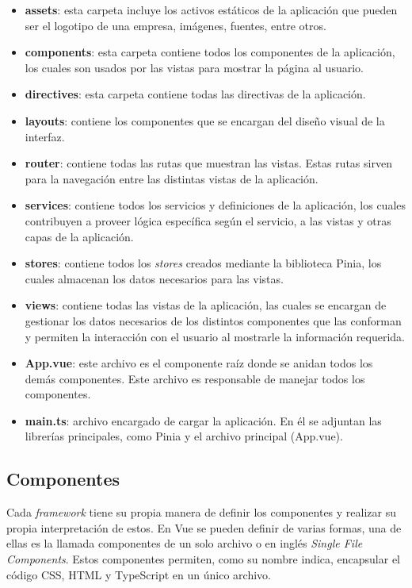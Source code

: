 \begin{itemize}
\item \textbf{assets}: esta carpeta incluye los activos estáticos de la aplicación que pueden ser el logotipo de una empresa, imágenes, fuentes, entre otros.
\item \textbf{components}: esta carpeta contiene todos los componentes de la aplicación, los cuales son usados por las vistas para mostrar la página al usuario.
\item \textbf{directives}: esta carpeta contiene todas las directivas de la aplicación.
\item \textbf{layouts}: contiene los componentes que se encargan del diseño visual de la interfaz.
\item \textbf{router}: contiene todas las rutas que muestran las vistas. Estas rutas sirven para la navegación entre las distintas vistas de la aplicación.
\item \textbf{services}: contiene todos los servicios y definiciones de la aplicación, los cuales contribuyen a proveer lógica específica según el servicio, a las vistas y otras capas de la aplicación.
\item \textbf{stores}: contiene todos los \textit{stores} creados mediante la biblioteca Pinia, los cuales almacenan los datos necesarios para las vistas.
\item \textbf{views}: contiene todas las vistas de la aplicación, las cuales se encargan de gestionar los datos necesarios de los distintos componentes que las conforman y permiten la interacción con el usuario al mostrarle la información requerida.
\item \textbf{App.vue}: este archivo es el componente raíz donde se anidan todos los demás componentes. Este archivo es responsable de manejar todos los componentes.
\item \textbf{main.ts}: archivo encargado de cargar la aplicación. En él se adjuntan las librerías principales, como Pinia y el archivo principal (App.vue).
\end{itemize}

\subsection{Componentes}
Cada \textit{framework} tiene su propia manera de definir los componentes y realizar su propia interpretación de estos. En Vue se pueden definir de varias formas, una de ellas  es la llamada componentes de un solo archivo o en inglés \textit{Single File Components}. Estos componentes permiten, como su nombre indica, encapsular el código CSS, HTML y TypeScript en un único archivo.

